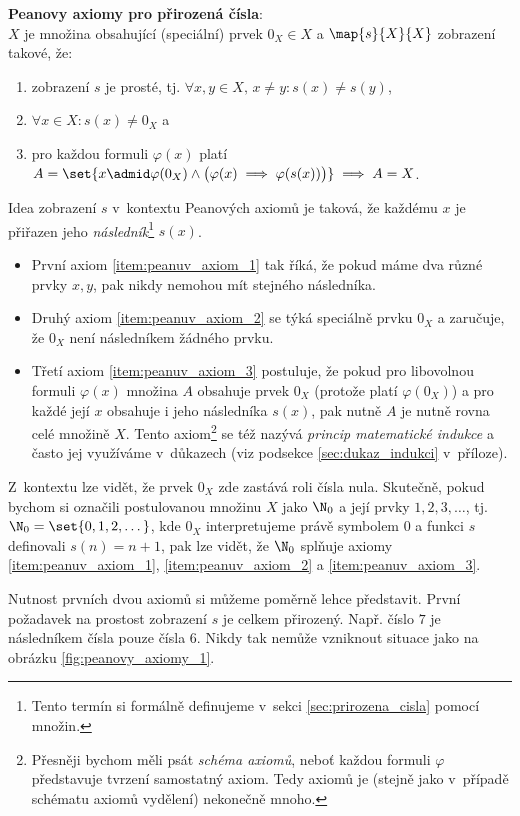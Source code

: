\noindent\textbf{Peanovy axiomy pro přirozená čísla}:\\
$X$ je množina obsahující (speciální) prvek $0_X\in X$ a $\map{s}{X}{X}$ zobrazení takové, že:
\begin{enumerate}[label=({P}\arabic*)]
    \item\label{item:peanuv_axiom_1} zobrazení $s$ je prosté, tj. $\forall x,y\in X,\,x\neq y: s(x)\neq s(y)$,
    \item\label{item:peanuv_axiom_2} $\forall x\in X: s(x)\neq 0_X$ a
    \item\label{item:peanuv_axiom_3} pro každou formuli $\varphi(x)$ platí $A=\set{x \admid \varphi(0_X) \land \big(\varphi(x)\implies \varphi(s(x))\big)}\implies A=X$.
\end{enumerate}
Idea zobrazení $s$ v~kontextu Peanových axiomů je taková, že každému $x$ je přiřazen jeho \emph{následník}\footnote{Tento termín si formálně definujeme v~sekci \ref{sec:prirozena_cisla} pomocí množin.} $s(x)$.
\begin{itemize}
    \item První axiom \ref{item:peanuv_axiom_1} tak říká, že pokud máme dva různé prvky $x,y$, pak nikdy nemohou mít stejného následníka.
    \item Druhý axiom \ref{item:peanuv_axiom_2} se týká speciálně prvku $0_X$ a zaručuje, že $0_X$ není následníkem žádného prvku.
    \item Třetí axiom \ref{item:peanuv_axiom_3} postuluje, že pokud pro libovolnou formuli $\varphi(x)$ množina $A$ obsahuje prvek $0_X$ (protože platí $\varphi(0_X)$) a pro každé její $x$ obsahuje i jeho následníka $s(x)$, pak nutně $A$ je nutně rovna celé množině $X$. Tento axiom\footnote{Přesněji bychom měli psát \emph{schéma axiomů}, neboť každou formuli $\varphi$ představuje tvrzení samostatný axiom. Tedy axiomů je (stejně jako v~případě schématu axiomů vydělení) nekonečně mnoho.} se též nazývá \emph{princip matematické indukce} a často jej využíváme v~důkazech (viz podsekce \ref{sec:dukaz_indukci} v~příloze).
\end{itemize}
Z~kontextu lze vidět, že prvek $0_X$ zde zastává roli čísla nula. Skutečně, pokud bychom si označili postulovanou množinu $X$ jako $\N_0$ a její prvky $1,2,3,\dots$, tj. $\N_0=\set{0,1,2,\dots}$, kde $0_X$ interpretujeme právě symbolem $0$ a funkci $s$ definovali $s(n)=n+1$, pak lze vidět, že $\N_0$ splňuje axiomy \ref{item:peanuv_axiom_1}, \ref{item:peanuv_axiom_2} a \ref{item:peanuv_axiom_3}.\par
Nutnost prvních dvou axiomů si můžeme poměrně lehce představit. První požadavek na prostost zobrazení $s$ je celkem přirozený. Např. číslo $7$ je následníkem čísla pouze čísla $6$. Nikdy tak nemůže vzniknout situace jako na obrázku \ref{fig:peanovy_axiomy_1}.
